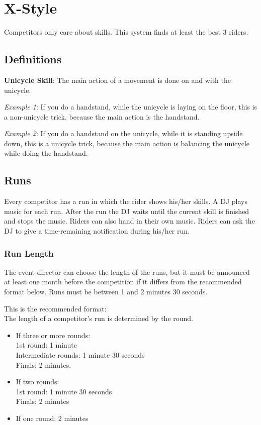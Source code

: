 \chapter{X-Style}
Competitors only care about skills.
This system finds at least the best 3 riders.

\section{Definitions}
\textbf{Unicycle Skill}: The main action of a movement is done on and with the unicycle.

\textit{Example 1}: If you do a handstand, while the unicycle is laying on the floor, this is a non-unicycle trick, because the main action is the handstand.

\textit{Example 2}: If you do a handstand on the unicycle, while it is standing upside down, this is a unicycle trick, because the main action is balancing the unicycle while doing the handstand.

\section{Runs}
Every competitor has a run in which the rider shows his/her skills.
A DJ plays music for each run.
After the run the DJ waits until the current skill is finished and stops the music.
Riders can also hand in their own music.
Riders can ask the DJ to give a time-remaining notification during his/her run.

\subsection{Run Length}
The event director can choose the length of the runs, but it must be announced at least one month before the competition if it differs from the recommended format below.
Runs must be between 1 and 2 minutes 30 seconds.

This is the recommended format: \\
The length of a competitor's run is determined by the round.
\begin{itemize}
\item If three or more rounds: \\
1st round: 1 minute \\
Intermediate rounds: 1 minute 30 seconds \\
Finals: 2 minutes.
\item If two rounds: \\
1st round: 1 minute 30 seconds \\
Finals: 2 minutes
\item If one round: 2 minutes
\end{itemize}

